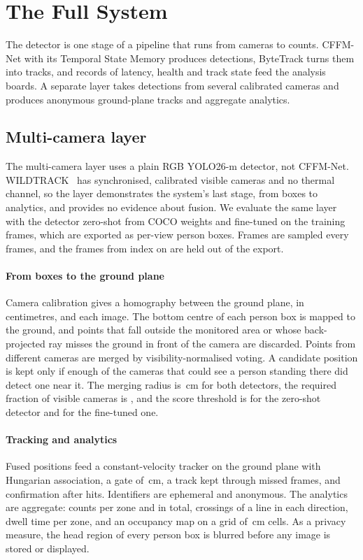 \section{The Full System}
\label{sec:system}
The detector is one stage of a pipeline that runs from cameras to counts. CFFM-Net with its Temporal State Memory produces detections, ByteTrack turns them into tracks, and records of latency, health and track state feed the analysis boards. A separate layer takes detections from several calibrated cameras and produces anonymous ground-plane tracks and aggregate analytics.

\subsection{Multi-camera layer}
The multi-camera layer uses a plain RGB YOLO26-m detector, not CFFM-Net. WILDTRACK~\cite{chavdarova2018wildtrack} has \cfgCamViews{} synchronised, calibrated visible cameras and no thermal channel, so the layer demonstrates the system's last stage, from boxes to analytics, and provides no evidence about fusion. We evaluate the same layer with the detector zero-shot from COCO weights and fine-tuned on the training frames, which are exported as per-view person boxes. Frames are sampled every \cfgWtStep{} frames, and the frames from index \cfgWtTestFrom{} on are held out of the export.

\paragraph{From boxes to the ground plane}
Camera calibration gives a homography between the ground plane, in centimetres, and each image. The bottom centre of each person box is mapped to the ground, and points that fall outside the monitored area or whose back-projected ray misses the ground in front of the camera are discarded. Points from different cameras are merged by visibility-normalised voting. A candidate position is kept only if enough of the cameras that could see a person standing there did detect one near it. The merging radius is \camFusionFineTunedRadius{}\,cm for both detectors, the required fraction of visible cameras is \camFusionFineTunedMinRatio{}, and the score threshold is \camFusionZeroShotMinScore{} for the zero-shot detector and \camFusionFineTunedMinScore{} for the fine-tuned one.

\paragraph{Tracking and analytics}
Fused positions feed a constant-velocity tracker on the ground plane with Hungarian association, a gate of \cfgTrackGate{}\,cm, a track kept through \cfgTrackMiss{} missed frames, and confirmation after \cfgTrackHits{} hits. Identifiers are ephemeral and anonymous. The analytics are aggregate: counts per zone and in total, crossings of a line in each direction, dwell time per zone, and an occupancy map on a grid of \cfgGroundCell{}\,cm cells. As a privacy measure, the head region of every person box is blurred before any image is stored or displayed.

